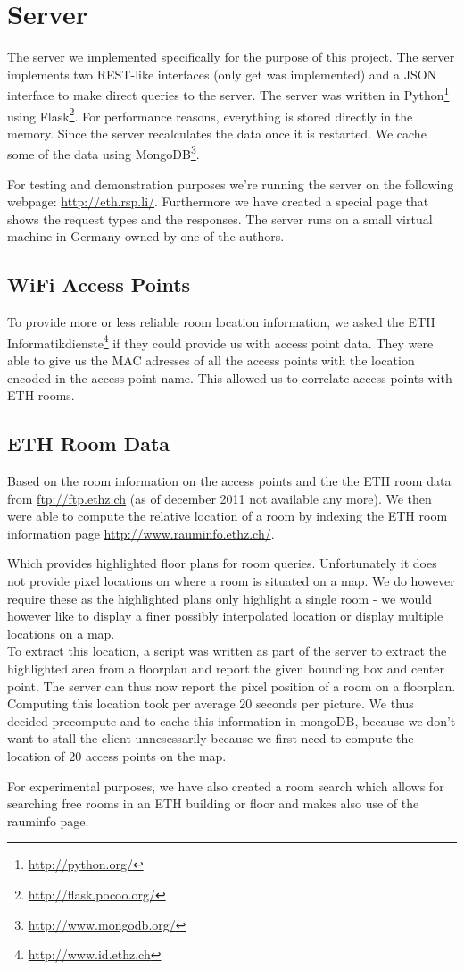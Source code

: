 \section{Server}
The server we implemented specifically for the purpose of this project. The server implements two REST-like interfaces (only get was implemented) and a JSON interface to make direct queries to the server. 
The server was written in Python\footnote{\url{http://python.org/}} using Flask\footnote{\url{http://flask.pocoo.org/}}. For performance reasons, everything is stored directly in the memory. Since the server recalculates the data once it is restarted. We cache some of the data using MongoDB\footnote{\url{http://www.mongodb.org/}}. 

For testing and demonstration purposes we're running the server on the following webpage: \url{http://eth.rsp.li/}. Furthermore we have created a special page that shows the request types and the responses. The server runs on a small virtual machine in Germany owned by one of the authors. 
\subsection{WiFi Access Points}
To provide more or less reliable room location information, we asked the ETH Informatikdienste\footnote{\url{http://www.id.ethz.ch}} if they could provide us with access point data. They were able to give us the MAC adresses of all the access points with the location encoded in the access point name. This allowed us to correlate access points with ETH rooms. 
\subsection{ETH Room Data}
Based on the room information on the access points and the the ETH room data from \url{ftp://ftp.ethz.ch} (as of december 2011 not available any more). We then were able to compute the relative location of a room by indexing the ETH room information page \url{http://www.rauminfo.ethz.ch/}. 

Which provides highlighted floor plans for room queries. Unfortunately it does not provide pixel locations on where a room is situated on a map. We do however require these as the highlighted plans only highlight a single room - we would however like to display a finer possibly interpolated location or display multiple locations on a map.\\
To extract this location, a script was written as part of the server to extract the highlighted area from a floorplan and report the given bounding box and center point. The server can thus now report the pixel position of a room on a floorplan.
Computing this location took per average 20 seconds per picture. We thus decided precompute and to cache this information in mongoDB, because we don't want to stall the client unnesessarily because we first need to compute the location of $20$ access points on the map. 

For experimental purposes, we have also created a room search which allows for searching free rooms in an ETH building or floor and makes also use of the rauminfo page. 